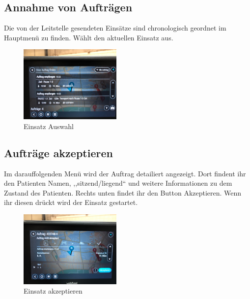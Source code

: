 \documentclass[a4paper,12pt]{scrartcl}
\begin{document}
    \subsection{Annahme von Aufträgen}
    Die von der Leitstelle gesendeten Einsätze sind chronologisch geordnet im Hauptmenü zu finden.
    Wählt den aktuellen Einsatz aus.
    \begin{figure}[h]
        \begin{center}
            \includegraphics[width=5cm]{bilder/annahme.jpg}
            \caption{Einsatz Auswahl}
            \label{Auswahl}
        \end{center}
    \end{figure}
    
    \newpage
    \subsection{Aufträge akzeptieren}
    Im darauffolgenden Menü wird der Auftrag detailiert angezeigt. Dort findent ihr den Patienten Namen, ,,sitzend/liegend`` und
    weitere Informationen zu dem Zustand des Patienten. Rechts unten findet ihr den Button Akzeptieren. Wenn ihr diesen drückt wird der Einsatz gestartet.
    \begin{figure}[h]
        \begin{center}
            \includegraphics[width=5cm]{bilder/akzeptieren.jpg}
            \caption{Einsatz akzeptieren}
            \label{akzeptieren}
        \end{center}     
    \end{figure}
\end{document}
